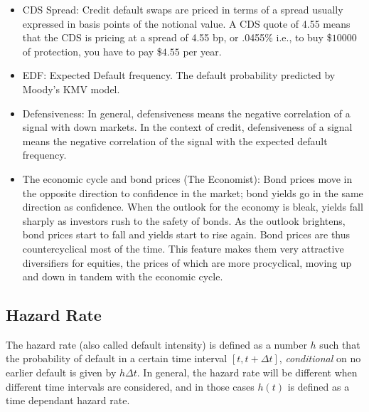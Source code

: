 \documentclass{amsart}
\theoremstyle{plain}
\numberwithin{equation}{section}
\begin{document}
\begin{itemize}
For bonds with negative convexity, the duration increases with increase 
in interest rates and vice-versa. 

Historically,  the US aggregate index has shown rates-up-duration-up
behaviour due to the callability feature of various bonds in the index
composition. This pattern holds even more strongly in the US Mortgage Backed Securities (MBS). The US Credit Index on the other hand has historically followed the more intuitive rates-up-duration-down behaviour. Also note that there are indices which do not show a reliable impact of rate changes on duration changes either way. 

\item CDS Spread: Credit default swaps are priced in terms of a spread usually expressed in basis points of the notional value. A CDS quote of 4.55 means that the CDS is pricing at a spread of 4.55 bp, or .0455\% i.e., to buy \$$10000$ of protection, you have to pay \$$4.55$ per year.

\item EDF: Expected Default frequency. The default probability predicted by Moody's KMV model.

\item Defensiveness: In general, defensiveness means the negative correlation of a signal with 
down markets. In the context of credit, defensiveness of a signal means the negative correlation of the signal with the expected default frequency.

\item The economic cycle and bond prices (The Economist): 
Bond prices move in the opposite direction to confidence
in the market; bond yields go in the same direction as confidence. When the outlook for the economy is bleak,  yields fall sharply as investors rush to the safety of bonds. As the outlook brightens, bond prices start to fall and yields start to rise again. Bond prices are thus countercyclical most of the time. This feature makes them very attractive diversifiers for equities, the prices of which are more procyclical, moving up and down in tandem with the economic cycle.


\end{itemize}
\subsection{Hazard Rate}
The hazard rate (also called default intensity) is defined 
as a number $h$ such that the probability of default in a certain time interval $[t, t+\Delta t]$, \emph{conditional} on no earlier default is given by $h\Delta t$. In general, the hazard rate will be different when different time intervals
are considered, and in those cases $h(t)$ is defined
as a time dependant hazard rate.
\end{document}
